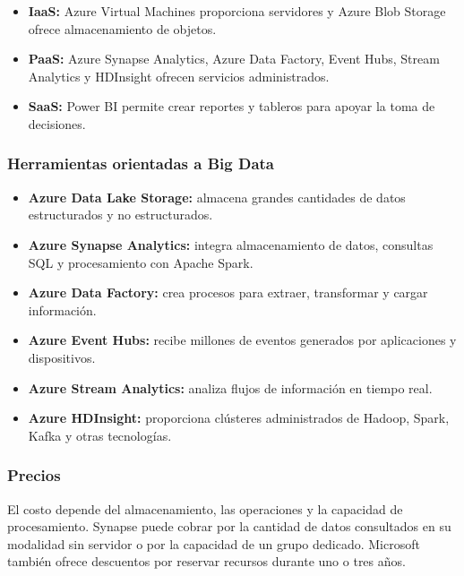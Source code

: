 \begin{itemize}
    \item \textbf{IaaS:} Azure Virtual Machines proporciona servidores y Azure
    Blob Storage ofrece almacenamiento de objetos.
    
    \item \textbf{PaaS:} Azure Synapse Analytics, Azure Data Factory, Event Hubs,
    Stream Analytics y HDInsight ofrecen servicios administrados.
    
    \item \textbf{SaaS:} Power BI permite crear reportes y tableros para apoyar
    la toma de decisiones.
\end{itemize}

\subsubsection*{Herramientas orientadas a Big Data}

\begin{itemize}
    \item \textbf{Azure Data Lake Storage:} almacena grandes cantidades de datos
    estructurados y no estructurados.
    
    \item \textbf{Azure Synapse Analytics:} integra almacenamiento de datos,
    consultas SQL y procesamiento con Apache Spark.
    
    \item \textbf{Azure Data Factory:} crea procesos para extraer, transformar
    y cargar información.
    
    \item \textbf{Azure Event Hubs:} recibe millones de eventos generados por
    aplicaciones y dispositivos.
    
    \item \textbf{Azure Stream Analytics:} analiza flujos de información en
    tiempo real.
    
    \item \textbf{Azure HDInsight:} proporciona clústeres administrados de
    Hadoop, Spark, Kafka y otras tecnologías.
\end{itemize}

\subsubsection*{Precios}

El costo depende del almacenamiento, las operaciones y la capacidad de
procesamiento. Synapse puede cobrar por la cantidad de datos consultados en su
modalidad sin servidor o por la capacidad de un grupo dedicado. Microsoft
también ofrece descuentos por reservar recursos durante uno o tres años.

